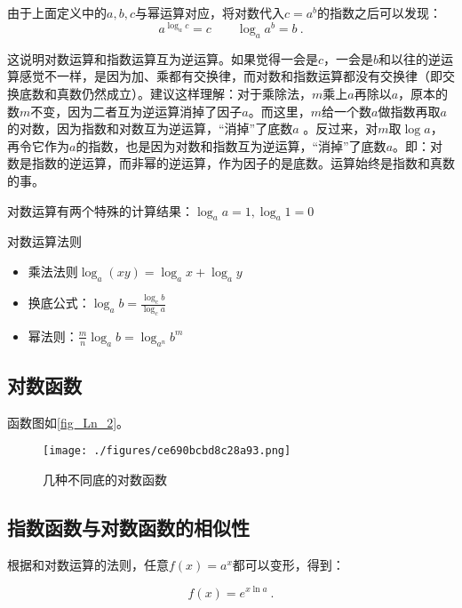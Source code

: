 由于上面定义中的$a,b,c$与幂运算对应，将对数代入$c=a^b$的指数之后可以发现：
\begin{equation}
a^{\log_a c}=c\qquad \log_a a^b=b~.
\end{equation}

这说明对数运算和指数运算互为逆运算。如果觉得一会是$c$，一会是$b$和以往的逆运算感觉不一样，是因为加、乘都有交换律，而对数和指数运算都没有交换律（即交换底数和真数仍然成立）。建议这样理解：对于乘除法，$m$乘上$a$再除以$a$，原本的数$m$不变，因为二者互为逆运算消掉了因子$a$。而这里，$m$给一个数$a$做指数再取$a$的对数，因为指数和对数互为逆运算，“消掉”了底数$a$ 。反过来，对$m$取$\log a$，再令它作为$a$的指数，也是因为对数和指数互为逆运算，“消掉”了底数$a$。即：对数是指数的逆运算，而非幂的逆运算，作为因子的是底数。运算始终是指数和真数的事。

对数运算有两个特殊的计算结果：$\log_a a=1,\log_a1=0$

\begin{theorem}{对数运算法则}
\begin{itemize}
\item 乘法法则$\log_a(xy)=\log_ax+\log_ay$
\item 换底公式：$\displaystyle \log_a b=\frac{\log_cb}{\log_ca}$
\item 幂法则：$\displaystyle \frac{m}{n}\log_a b=\log_{a^n} b^m$
\end{itemize}
\end{theorem}

\subsection{对数函数}

函数图如\autoref{fig_Ln_2}。
\begin{figure}[ht]
\centering
\texttt{[image: ./figures/ce690bcbd8c28a93.png]}
\caption{几种不同底的对数函数} \label{fig_Ln_2}
\end{figure}


\subsection{指数函数与对数函数的相似性}


根据和对数运算的法则，任意$f(x)=a^x$都可以变形，得到：

\begin{equation}
f(x)=e^{x\ln a}~.
\end{equation}

